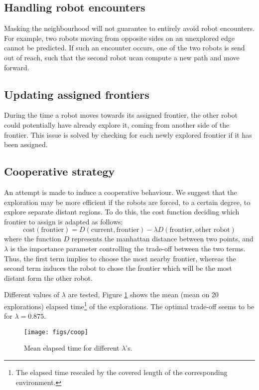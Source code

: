 \documentclass[12pt]{report}
\begin{document}
\subsection*{Handling robot encounters}
Masking the neighbourhood will not guarantee to entirely avoid robot encounters. For example, two robots moving from opposite sides on an unexplored edge cannot be predicted. If such an encounter occurs, one of the two robots is send out of reach, such that the second robot ucan compute a new path and move forward.

\subsection*{Updating assigned frontiers}
During the time a robot moves towards its assigned frontier, the other robot could potentially have already explore it, coming from another side of the frontier. This issue is solved by checking for each newly explored frontier if it has been assigned.

\subsection*{Cooperative strategy}
An attempt is made to induce a cooperative behaviour. We suggest that the exploration may be more efficient if the robots are forced, to a certain degree, to explore separate distant regions. To do this, the cost function deciding which frontier to assign is adapted as follows:
\begin{equation}
\text{cost}(\text{frontier}) = D(\text{current}, \text{frontier}) - \lambda D(\text{frontier}, \text{other robot})
\end{equation}
where the function $D$ represents the manhattan distance between two points, and $\lambda$ is the importance parameter controlling the trade-off between the two terms. Thus, the first term implies to choose the most nearby frontier, whereas the second term induces the robot to chose the frontier which will be the most distant form the other robot.

Different values of $\lambda$ are tested, Figure \ref{fig:coop} shows the mean (mean on 20 explorations) elapsed time\footnote{The elapsed time rescaled by the covered length of the corresponding environment.} of the explorations. The optimal trade-off seems to be for $\lambda = 0.875$.
\begin{figure}[!h]
\centering
\texttt{[image: figs/coop]}
\caption{Mean elapsed time for different $\lambda$'s.}
\label{fig:coop}
\end{figure}
\end{document}
